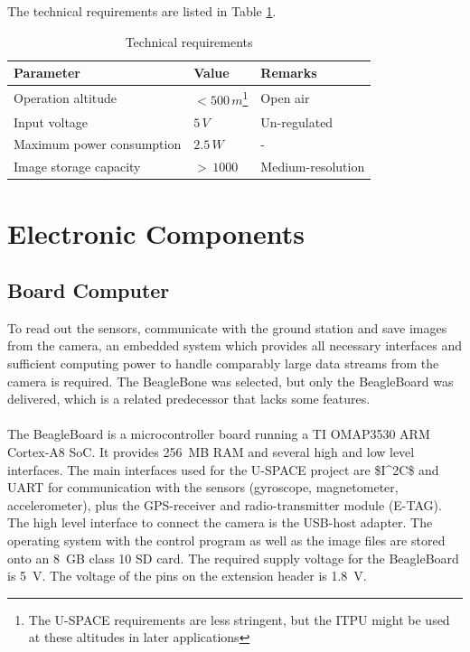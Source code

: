 \noindent
The technical requirements are listed in Table \ref{tab:technical}.

\begin{table}[H]
\centering
\caption{Technical requirements}
\label{tab:technical}
\begin{minipage}{\textwidth}
\begin{tabular}{p{}p{}p{}}
\hline
\textbf{Parameter} & \textbf{Value} & \textbf{Remarks}\\ \hline
Operation altitude & $< 500\,m$\footnote{The \ac{U-SPACE} requirements are less stringent, but the \ac{ITPU} might be used at these altitudes in later applications} & Open air\\
Input voltage & $5\,V$ & Un-regulated\\
Maximum power consumption  & $2.5\,W$ & -\\
Image storage capacity & $>\,1000$ & Medium-resolution\\
\hline
\end{tabular}\par
\vspace{-0.75\skip\footins}
\renewcommand{\footnoterule}{}
\end{minipage}
\vspace{-1.0em}
\end{table}

\section{Electronic Components}

\subsection{Board Computer}

To read out the sensors, communicate with the ground station and save images from the camera, an embedded system which provides all necessary interfaces and sufficient computing power to handle comparably large data streams from the camera is required. The BeagleBone \cite{website:beaglebone, BeagleBone:SRM} was selected, but only the BeagleBoard \cite{website:beagleboard} was delivered, which is a related predecessor that lacks some features.
\\
\\
The BeagleBoard is a microcontroller board running a TI OMAP3530 ARM Cortex-A8 \ac{SoC}. It provides 256~MB RAM and several high and low level interfaces. The main interfaces used for the \ac{U-SPACE} project are \ac{$I^2C$} and \ac{UART} for communication with the sensors (gyroscope, magnetometer, accelerometer), plus the \ac{GPS}-receiver and radio-transmitter module (E-TAG). The high level interface to connect the camera is the \ac{USB}-host adapter. The operating system with the control program as well as the image files are stored onto an 8~GB class 10 \ac{SD} card. The required supply voltage for the BeagleBoard is 5~V. The voltage of the pins on the extension header is 1.8~V.

